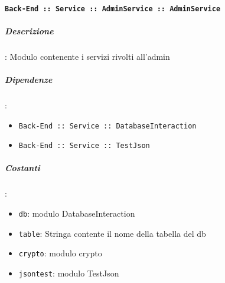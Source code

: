 \documentclass[../DefinizioneDiProdotto_v2.0.0.tex]{subfiles}
\begin{document}
\paragraph{\texttt{Back-End :: Service :: AdminService :: AdminService}}
\subparagraph{Descrizione}: Modulo contenente i servizi rivolti all'admin
\subparagraph{Dipendenze}:
\begin{itemize}
	\item \texttt{Back-End :: Service :: DatabaseInteraction}
	\item \texttt{Back-End :: Service :: TestJson}
\end{itemize}
\subparagraph{Costanti}:
\begin{itemize}
	\item \texttt{db}: modulo DatabaseInteraction
	\item \texttt{table}: Stringa contente il nome della tabella del db
	\item \texttt{crypto}: modulo crypto
	\item \texttt{jsontest}: modulo TestJson
\end{itemize}
\end{document}
